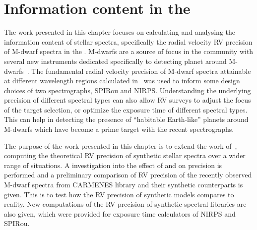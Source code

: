 
\chapter{Information content in the \nir{}}
\label{cha:nir_content}

The work presented in this chapter focuses on calculating and analysing the information content of stellar spectra, specifically the radial velocity {RV} precision of M-dwarf spectra in the \nir{}. 
M-dwarfs are a source of focus in the community with several new instruments dedicated specifically to detecting planet around M-dwarfs~\citep[e.g.][among others]{quirrenbach_carmenes_2014, bouchy_nearinfrared_2017, artigau_spirou_2014}.
The fundamental radial velocity precision of {M-dwarf} spectra attainable at different wavelength regions calculated in~\citet{figueira_radial_2016} was used to inform some design choices of two \nir{} spectrographs, {SPIRou} and {NIRPS}.
Understanding the underlying precision of different spectral types can also allow {RV} surveys to adjust the focus of the target selection, or optimize the exposure time of different spectral types.
This can help in detecting the presence of ``habitable Earth-like'' planets around {M-dwarfs} which have become a prime target with the recent \nir{} spectrographs.

The purpose of the work presented in this chapter is to extend the work of~\citet{figueira_radial_2016}, computing the theoretical {RV} precision of synthetic stellar spectra over a wider range of situations.
A investigation into the effect of \Logg{} and \feh{} on precision is performed and a preliminary comparison of {RV} precision of the recently observed \nir{} {M-dwarf} spectra from {CARMENES} library and their synthetic counterparts is given.
This is to test how the {RV} precision of synthetic models compares to reality.
New computations of the {RV} precision of synthetic spectral libraries are also given, which were provided for exposure time calculators of {NIRPS} and {SPIRou}.


